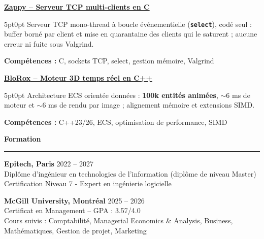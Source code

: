 \documentclass[9pt]{extarticle}
\begin{document}
\par\vspace{8pt}

\underline{\bfseries Zappy -- Serveur TCP multi-clients en C}
\par
\begin{adjustwidth}{5pt}{0pt}
    Serveur TCP mono-thread à boucle événementielle ({\bfseries \texttt{select}}), codé seul : buffer borné par client et mise en quarantaine des clients qui le saturent ; aucune erreur ni fuite sous Valgrind.
\end{adjustwidth}
\par
{\bfseries Compétences :} C, sockets TCP, select, gestion mémoire, Valgrind

\par\vspace{8pt}

\underline{\bfseries \href{https://github.com/paulogarithm/blorox}{BloRox} -- Moteur 3D temps réel en C++}
\par
\begin{adjustwidth}{5pt}{0pt}
	Architecture ECS orientée données : {\bfseries 100k entités animées}, $\sim$6 ms de moteur et $\sim$6 ms de rendu par image ; alignement mémoire et extensions SIMD.
\end{adjustwidth}
\par
{\bfseries Compétences :} C++23/26, ECS, optimisation de performance, SIMD

\par\vspace{8pt}

{\large\bfseries Formation}
\par\vspace{-8pt}
\rule{\linewidth}{0.4pt}
\par\vspace{5pt}

{\bfseries Epitech, Paris} \hfill 2022 -- 2027 \\
Diplôme d'ingénieur en technologies de l'information (diplôme de niveau Master) \\
Certification Niveau 7 - Expert en ingénierie logicielle

\vspace{6pt}

{\bfseries McGill University, Montréal} \hfill 2025 -- 2026 \\
Certificat en Management -- GPA : 3.57/4.0 \\
Cours suivis : Comptabilité, Managerial Economics \& Analysis, Business, Mathématiques, Gestion de projet, Marketing
\end{document}
